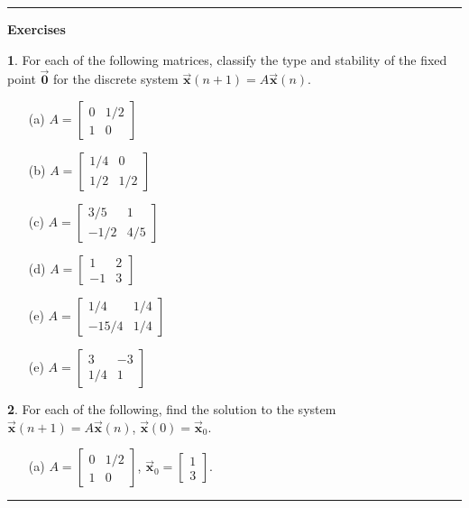 \documentclass[reqno]{immbook}
\newcommand{\BX}{\vec{\textbf{x}}}
\newcommand{\BZero}{\vec{\textbf{0}}}  %
\newcommand{\ds}{\displaystyle}
\numberwithin{equation}{chapter}
\numberwithin{question}{section}
\numberwithin{theorem}{chapter}
\numberwithin{figure}{chapter}
\theoremstyle{definition}
\newtheorem{exercise}{}[section]
\newenvironment{exercises}%
{%
\medskip\hrule\medskip\noindent\textbf{Exercises}%
}%
{%
\medskip\hrule
}
\begin{document}
\begin{exercises}
\begin{exercise}
For each of the following matrices, classify the
type and stability of the fixed point $\BZero$
for the discrete system $\BX(n+1) = A\BX(n)$.
\begin{enumerate}
\item[(a)]
$\ds A  =  \begin{bmatrix}
              0 & 1/2 \\
              1 & 0
           \end{bmatrix}$
\item[(b)]
$\ds A  =  \begin{bmatrix}
              1/4 & 0 \\
              1/2 & 1/2
           \end{bmatrix}$
\item[(c)]
$\ds A  =  \begin{bmatrix}
              3/5 & 1 \\
              -1/2 & 4/5
           \end{bmatrix}$
\item[(d)]
$\ds A  =  \begin{bmatrix}
              1 & 2 \\
              -1 & 3
           \end{bmatrix}$
\item[(e)]
$\ds A  =  \begin{bmatrix}
              1/4 & 1/4 \\
              -15/4 & 1/4
           \end{bmatrix}$
\item[(e)]
$\ds A  =  \begin{bmatrix}
              3 & -3 \\
              1/4 & 1
           \end{bmatrix}$
\end{enumerate}
\end{exercise}
\begin{exercise}
For each of the following, find the solution to the
system $\BX(n+1)=A\BX(n)$, $\BX(0)=\BX_0$.
\begin{enumerate}
\item[(a)]
$\ds A  =  \begin{bmatrix}
              0 & 1/2 \\
              1 & 0
           \end{bmatrix}$, \hspace*{.25cm} 
$\ds \BX_0 = \begin{bmatrix} 1 \\ 3 \end{bmatrix}$.

\end{enumerate}
\end{exercise}
\end{exercises}
\end{document}
